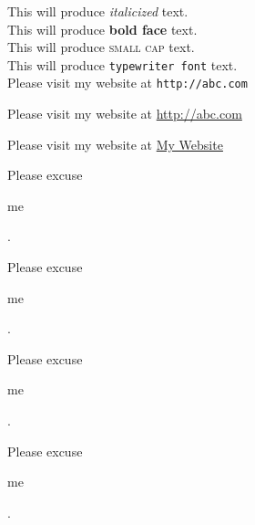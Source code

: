 \documentclass[11pt]{article}
\begin{document}
This will produce \textit{italicized} text.\\

This will produce \textbf{bold face} text.\\

This will produce \textsc{small cap} text.\\

This will produce \texttt{typewriter font} text.\\

Please visit my website at \texttt{http://abc.com}

Please visit my website at \url{http://abc.com}
 
Please visit my website at \href{http://abc.com}{My Website}

\vspace{1cm}

Please excuse \begin{large}me\end{large}.

Please excuse \begin{Large}me\end{Large}.

Please excuse \begin{huge}me\end{huge}.

Please excuse \begin{Huge}me\end{Huge}.
\end{document}
